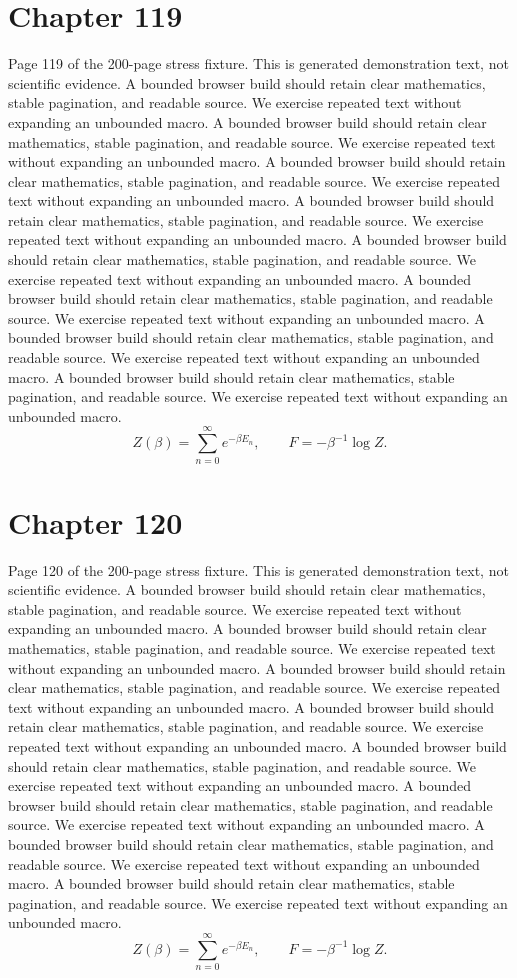 \documentclass[11pt]{article}
\begin{document}
\section*{Chapter 119}
Page 119 of the 200-page stress fixture. This is generated demonstration text, not scientific evidence.
A bounded browser build should retain clear mathematics, stable pagination, and readable source. We exercise repeated text without expanding an unbounded macro.
A bounded browser build should retain clear mathematics, stable pagination, and readable source. We exercise repeated text without expanding an unbounded macro.
A bounded browser build should retain clear mathematics, stable pagination, and readable source. We exercise repeated text without expanding an unbounded macro.
A bounded browser build should retain clear mathematics, stable pagination, and readable source. We exercise repeated text without expanding an unbounded macro.
A bounded browser build should retain clear mathematics, stable pagination, and readable source. We exercise repeated text without expanding an unbounded macro.
A bounded browser build should retain clear mathematics, stable pagination, and readable source. We exercise repeated text without expanding an unbounded macro.
A bounded browser build should retain clear mathematics, stable pagination, and readable source. We exercise repeated text without expanding an unbounded macro.
A bounded browser build should retain clear mathematics, stable pagination, and readable source. We exercise repeated text without expanding an unbounded macro.
\[Z(\beta)=\sum_{n=0}^{\infty}e^{-\beta E_n},\qquad F=-\beta^{-1}\log Z.\]
\newpage
\section*{Chapter 120}
Page 120 of the 200-page stress fixture. This is generated demonstration text, not scientific evidence.
A bounded browser build should retain clear mathematics, stable pagination, and readable source. We exercise repeated text without expanding an unbounded macro.
A bounded browser build should retain clear mathematics, stable pagination, and readable source. We exercise repeated text without expanding an unbounded macro.
A bounded browser build should retain clear mathematics, stable pagination, and readable source. We exercise repeated text without expanding an unbounded macro.
A bounded browser build should retain clear mathematics, stable pagination, and readable source. We exercise repeated text without expanding an unbounded macro.
A bounded browser build should retain clear mathematics, stable pagination, and readable source. We exercise repeated text without expanding an unbounded macro.
A bounded browser build should retain clear mathematics, stable pagination, and readable source. We exercise repeated text without expanding an unbounded macro.
A bounded browser build should retain clear mathematics, stable pagination, and readable source. We exercise repeated text without expanding an unbounded macro.
A bounded browser build should retain clear mathematics, stable pagination, and readable source. We exercise repeated text without expanding an unbounded macro.
\[Z(\beta)=\sum_{n=0}^{\infty}e^{-\beta E_n},\qquad F=-\beta^{-1}\log Z.\]
\newpage
\end{document}
